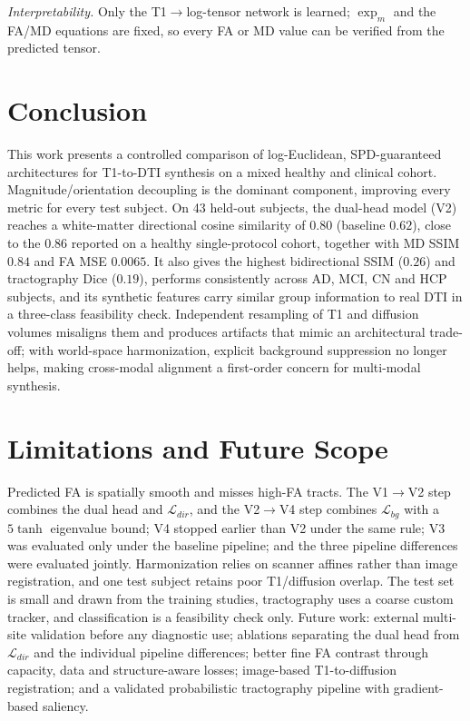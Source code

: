 \documentclass[conference,compsoc]{IEEEtran}
\begin{document}
\textit{Interpretability.} Only the T1$\to$log-tensor network is learned; $\exp_m$ and the FA/MD equations are fixed, so every FA or MD value can be verified from the predicted tensor.

\section{Conclusion}
\label{sec:conclusion}
This work presents a controlled comparison of log-Euclidean, SPD-guaranteed architectures for T1-to-DTI synthesis on a mixed healthy and clinical cohort. Magnitude/orientation decoupling is the dominant component, improving every metric for every test subject. On 43 held-out subjects, the dual-head model (V2) reaches a white-matter directional cosine similarity of $0.80$ (baseline $0.62$), close to the $0.86$ reported on a healthy single-protocol cohort, together with MD SSIM $0.84$ and FA MSE $0.0065$. It also gives the highest bidirectional SSIM ($0.26$) and tractography Dice ($0.19$), performs consistently across AD, MCI, CN and HCP subjects, and its synthetic features carry similar group information to real DTI in a three-class feasibility check. Independent resampling of T1 and diffusion volumes misaligns them and produces artifacts that mimic an architectural trade-off; with world-space harmonization, explicit background suppression no longer helps, making cross-modal alignment a first-order concern for multi-modal synthesis.

\section{Limitations and Future Scope}
\label{sec:limitations}
Predicted FA is spatially smooth and misses high-FA tracts. The V1$\to$V2 step combines the dual head and $\mathcal{L}_{dir}$, and the V2$\to$V4 step combines $\mathcal{L}_{bg}$ with a $5\tanh$ eigenvalue bound; V4 stopped earlier than V2 under the same rule; V3 was evaluated only under the baseline pipeline; and the three pipeline differences were evaluated jointly. Harmonization relies on scanner affines rather than image registration, and one test subject retains poor T1/diffusion overlap. The test set is small and drawn from the training studies, tractography uses a coarse custom tracker, and classification is a feasibility check only. Future work: external multi-site validation before any diagnostic use; ablations separating the dual head from $\mathcal{L}_{dir}$ and the individual pipeline differences; better fine FA contrast through capacity, data and structure-aware losses; image-based T1-to-diffusion registration; and a validated probabilistic tractography pipeline with gradient-based saliency.
\end{document}
